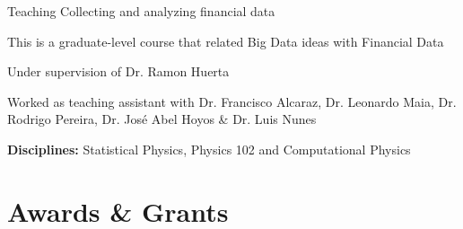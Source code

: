 \documentclass[letterpaper]{resume} %
\begin{document}
\begin{minipage}[t]{0.64\textwidth}
  \sectionspace %
  \sectionspace



  \begin{tightitemize}
  \item Teaching Collecting and analyzing financial data
  \item This is a graduate-level course that related Big Data ideas with Financial Data
  \end{tightitemize}


  \begin{tightitemize}
  \item Under supervision of Dr. Ramon Huerta
  \end{tightitemize}

  \sectionspace %
  \sectionspace



  \begin{tightitemize}
  \item Worked as teaching assistant with Dr. Francisco Alcaraz, Dr. Leonardo Maia, Dr. Rodrigo Pereira, Dr. Jos\'e Abel Hoyos \& Dr. Luis Nunes
  \item {\bf Disciplines:} Statistical Physics, Physics 102 and Computational Physics
  \end{tightitemize}

  \sectionspace %
  \sectionspace\sectionspace


  \section{Awards \& Grants}


\end{minipage}
\end{document}

